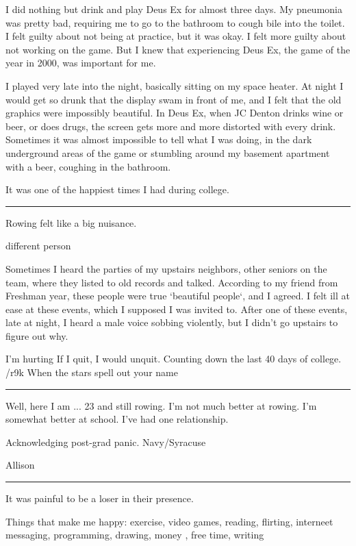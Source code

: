 I did nothing but drink and play Deus Ex for almost three days.  My pneumonia
was pretty bad, requiring me to go to the bathroom to cough bile into the
toilet.  I felt guilty about not being at practice, but it was okay.  I felt
more guilty about not working on the game.  But I knew that experiencing Deus
Ex, the game of the year in 2000, was important for me.

I played very late into the night, basically sitting on my space heater.  At
night I would get so drunk that the display swam in front of me, and I felt that
the old graphics were impossibly beautiful.  In Deus Ex, when JC Denton drinks
wine or beer, or does drugs, the screen gets more and more distorted with every
drink.  Sometimes it was almost impossible to tell what I was doing, in the dark
underground areas of the game or stumbling around my basement apartment with a
beer, coughing in the bathroom.

It was one of the happiest times I had during college.

\plainfancybreak{12pt}{2}{* * *}

Rowing felt like a big nuisance.

different person

Sometimes I heard the parties of my upstairs neighbors, other seniors on the
team, where they listed to old records and talked.  According to my friend from
Freshman year, these people were true `beautiful people`, and I agreed.  I felt
ill at ease at these events, which I supposed I was invited to.  After one of
these events, late at night, I heard a male voice sobbing violently, but I
didn't go upstairs to figure out why.

I'm hurting
If I quit, I would unquit.
Counting down the last 40 days of college.
/r9k
When the stars spell out your name

\plainfancybreak{12pt}{2}{* * *}

Well, here I am ... 23 and still rowing.  I'm not much better at rowing.  I'm
somewhat better at school.  I've had one relationship.


Acknowledging post-grad panic.
Navy/Syracuse

Allison

\plainfancybreak{12pt}{2}{* * *}


It was painful to be a loser in their presence.  

Things that make me happy: exercise, video games, reading, flirting, interneet
messaging, programming, drawing, money , free time, writing

